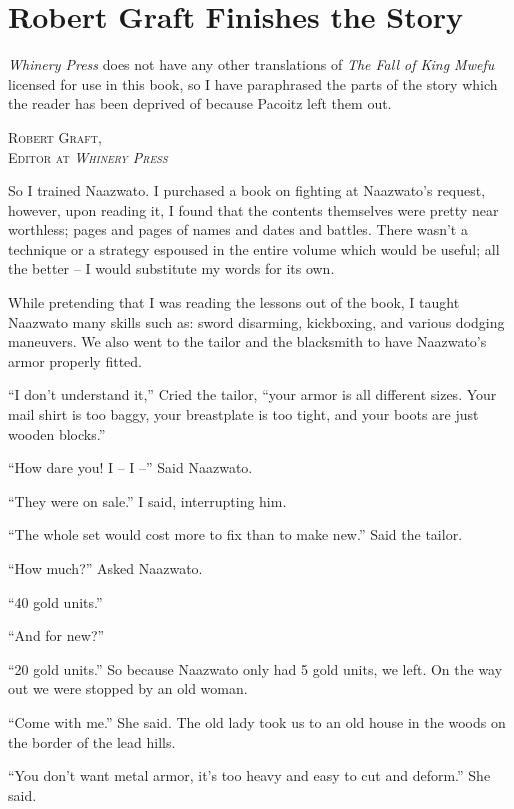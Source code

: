 \chapter{Robert Graft Finishes the Story}
\emph{Whinery Press} does not have any other translations of \emph{The Fall of King Mwe\-fu} licensed for use in this book, so I have paraphrased the parts of the story which the reader has been deprived of because Pa\-co\-itz left them out.

\begin{flushright}
\textsc{
Robert Graft,\\
Editor at \emph{Whinery Press}}
\end{flushright}

\tbreak

So I trained Naa\-zwa\-to. I purchased a book on fighting at Naa\-zwa\-to's request, however, upon reading it, I found that the contents themselves were pretty near worthless; pages and pages of names and dates and battles. There wasn't a technique or a strategy espoused in the entire volume which would be useful; all the better -- I would substitute my words for its own.

While pretending that I was reading the lessons out of the book, I taught Naa\-zwa\-to many skills such as: sword disarming, kickboxing, and various dodging maneuvers.  We also went to the tailor and the blacksmith to have Naa\-zwa\-to's armor properly fitted.

``I don't understand it,'' Cried the tailor, ``your armor is all different sizes. Your mail shirt is too baggy, your breastplate is too tight, and your boots are just wooden blocks.''

``How dare you! I -- I --'' Said Naa\-zwa\-to.

``They were on sale.'' I said, interrupting him.

``The whole set would cost more to fix than to make new.'' Said the tailor.

``How much?'' Asked Naa\-zwa\-to.

``40 gold units.'' 

``And for new?''

``20 gold units.'' So because Naa\-zwa\-to only had 5 gold units, we left. On the way out we were stopped by an old woman.

``Come with me.'' She said. The old lady took us to an old house in the woods on the border of the lead hills.

``You don't want metal armor, it's too heavy and easy to cut and deform.'' She said.

